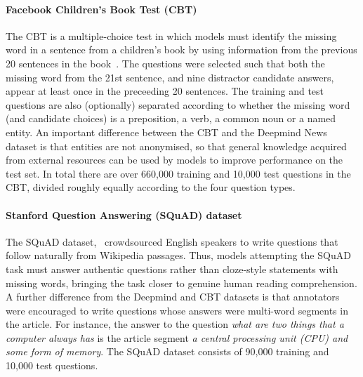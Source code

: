 \documentclass[11pt,letterpaper]{article}
\begin{document}
\paragraph{Facebook Children's Book Test (CBT)} The CBT is a multiple-choice test in which models must identify the missing word in a sentence from a children's book by using information from the previous 20 sentences in the book~. The questions were selected such that both the missing word from the 21st sentence, and nine distractor candidate answers, appear at least once in the preceeding 20 sentences. The training and test questions are also (optionally) separated according to whether the missing word (and candidate choices) is a preposition, a verb, a common noun or a named entity. An important difference between the CBT and the Deepmind News dataset is that entities are not anonymised, so that general knowledge acquired from external resources can be used by models to improve performance on the test set. In total there are over 660,000 training and 10,000 test questions in the CBT, divided roughly equally according to the four question types. 

\paragraph{Stanford Question Answering (SQuAD) dataset} The SQuAD dataset,~ crowdsourced English speakers to write questions that follow naturally from Wikipedia passages. Thus, models attempting the SQuAD task must answer authentic questions rather than cloze-style statements with missing words, bringing the task closer to genuine human reading comprehension. A further difference from the Deepmind and CBT datasets is that annotators were encouraged to write questions whose answers were multi-word segments in the article. For instance, the answer to the question \emph{what are two things that a computer always has} is the article segment \emph{a central processing unit (CPU) and some form of memory}. The SQuAD dataset consists of 90,000 training and 10,000 test questions. 
\end{document}
